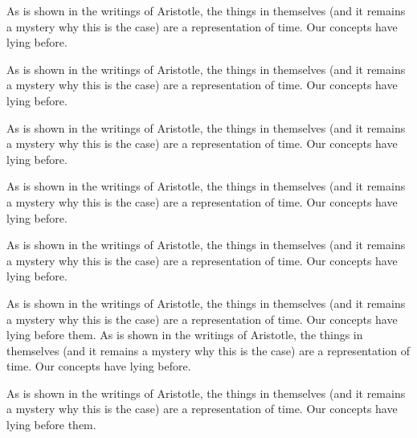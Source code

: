 \documentclass[12pt,chapterrefs]{ndsu-thesis-2022}
\begin{document}

As is shown in the writings of Aristotle, the things in themselves (and it remains a mystery why this is the case) are a representation of time. Our concepts have lying before.

\vspace{2ex}
\vspace{2ex}

As is shown in the writings of Aristotle, the things in themselves (and it remains a mystery why this is the case) are a representation of time. Our concepts have lying before.

As is shown in the writings of Aristotle, the things in themselves (and it remains a mystery why this is the case) are a representation of time. Our concepts have lying before.


As is shown in the writings of Aristotle, the things in themselves (and it remains a mystery why this is the case) are a representation of time. Our concepts have lying before.

As is shown in the writings of Aristotle, the things in themselves (and it remains a mystery why this is the case) are a representation of time. Our concepts have lying before.


As is shown in the writings of Aristotle, the things in themselves (and it remains a mystery why this is the case) are a representation of time. Our concepts have lying before them. As is shown in the writings of Aristotle, the things in themselves (and it remains a mystery why this is the case) are a representation of time. Our concepts have lying before.


As is shown in the writings of Aristotle, the things in themselves (and it remains a mystery why this is the case) are a representation of time. Our concepts have lying before them.


\makerefs%
\end{document}

